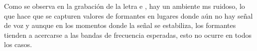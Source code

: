
Como se observa en la grabación de la letra e , hay un ambiente ms ruidoso, lo que hace que se capturen valores de formantes en lugares donde aún no hay señal de voz y aunque en los momentos donde la señal se estabiliza, los formantes tienden a acercarse a las bandas de frecuencia esperadas, esto no ocurre en todos los casos. 